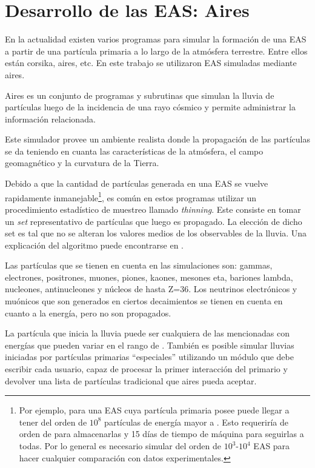 	\section{Desarrollo de las EAS: Aires}

	En la actualidad existen varios programas para simular la formación de una EAS a partir de una partícula primaria a lo largo de la atmósfera terrestre.
	Entre ellos están {\sc corsika}, {\sc aires}, etc.
	En este trabajo se utilizaron EAS simuladas mediante {\sc aires}.

	{\sc Aires} es un conjunto de programas y subrutinas que simulan la lluvia de partículas luego de la incidencia de una rayo cósmico y permite administrar la información relacionada. 

	Este simulador provee un ambiente realista donde la propagación de las partículas se da teniendo en cuanta las características de la atmósfera, el campo geomagnético y la curvatura de la Tierra. 
	
	Debido a que la cantidad de part\'iculas generada en una EAS se vuelve rapidamente inmanejable\footnote{Por ejemplo, para una EAS cuya part\'icula primaria posee  puede llegar a tener del orden de $10^8$ part\'iculas de energ\'ia mayor a . Esto requerir\'ia de orden de  para almacenarlas y 15 d\'ias de tiempo de m\'aquina para seguirlas a todas. Por lo general es necesario simular del orden de $10^3\textit{-}10^4$ EAS para hacer cualquier comparaci\'on con datos experimentales.}, es com\'un en estos programas utilizar un procedimiento estadístico de muestreo llamado {\em thinning}.
	Este consiste en tomar un \textit{set} representativo de part\'iculas que luego es propagado.
	La elecci\'on de dicho set es tal que no se alteran los valores medios de los observables de la lluvia.
	Una explicaci\'on del algoritmo puede encontrarse en \cite{thining}.

	Las partículas que se tienen en cuenta en las simulaciones son: gammas, electrones, positrones, muones, piones, kaones, mesones eta, bariones lambda, nucleones, antinucleones y núcleos de hasta Z=36.
	Los neutrinos electr\'onicos y mu\'onicos que son generados en ciertos decaimientos se tienen en cuenta en cuanto a la energía, pero no son propagados.
	
	La part\'icula que inicia la lluvia puede ser cualquiera de las mencionadas con energías que pueden variar en el rango de . 
	Tambi\'en es posible simular lluvias iniciadas por partículas primarias ``especiales'' utilizando un módulo que debe escribir cada usuario, capaz de procesar la primer interacción del primario y devolver una lista de part\'iculas tradicional que {\sc aires} pueda aceptar. 

